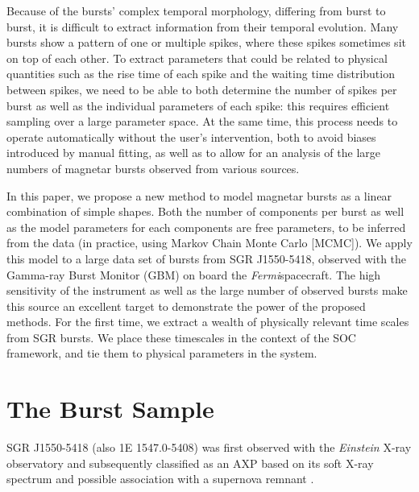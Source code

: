 \documentclass[12pt]{emulateapj}
\newcommand{\project}[1]{\textsl{#1}}
\newcommand{\fermi}{\project{Fermi}}
\begin{document}
Because of the bursts' complex temporal morphology, differing from burst to burst, it is difficult to extract information from their temporal evolution. 
Many bursts show a pattern of one or multiple spikes, where these spikes sometimes sit on top of each other. To extract parameters that could be related
to physical quantities such as the rise time of each spike and the waiting time distribution between spikes, we need to be able to both determine the 
number of spikes per burst as well as the individual parameters of each spike: this requires efficient sampling over a large parameter space.
At the same time, this process needs to operate automatically without the user's intervention, both to avoid biases introduced by manual fitting, as well as
 to allow for an analysis of the large numbers of magnetar bursts observed from various sources.

In this paper, we propose a new method to model magnetar bursts as a linear combination of simple shapes. Both the number of components
per burst as well as the model parameters for each components are free parameters, to be inferred from the data (in practice, using
Markov Chain Monte Carlo [MCMC]).
We apply this model to a large data set of bursts from SGR J1550-5418, observed with the Gamma-ray Burst Monitor (GBM) on board the \fermi spacecraft.
The high sensitivity of the instrument as well as 
the large number of observed bursts make this source an excellent target to demonstrate the power of the proposed methods. For the first time, 
we extract a wealth of physically relevant time scales from SGR bursts. 
We place these timescales in the context of the SOC framework, and tie them to physical parameters in the system.



\section{The Burst Sample}
\label{sec:data}

SGR J1550-5418 (also 1E 1547.0-5408) was first observed with the {\it Einstein} X-ray observatory \citep{lamb1981}
and subsequently classified as an AXP based on its soft X-ray spectrum and possible association with a supernova remnant \citep{gelfand2007}.
\end{document}
